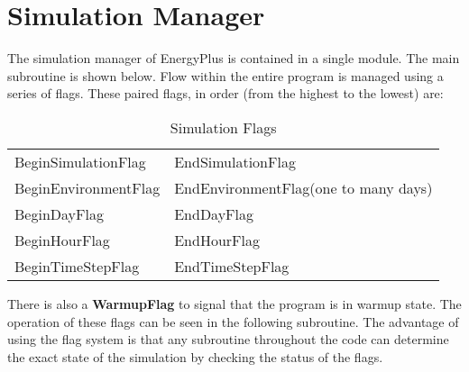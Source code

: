 \section{Simulation Manager}\label{simulation-manager}

The simulation manager of EnergyPlus is contained in a single module. The main subroutine is shown below. Flow within the entire program is managed using a series of flags. These paired flags, in order (from the highest to the lowest) are:

\begin{longtable}[c]{@{}ll@{}}
\caption{Simulation Flags \label{table:simulation-flags}}\\
\toprule 
BeginSimulationFlag & EndSimulationFlag \tabularnewline
BeginEnvironmentFlag & EndEnvironmentFlag(one to many days) \tabularnewline
BeginDayFlag & EndDayFlag \tabularnewline
BeginHourFlag & EndHourFlag \tabularnewline
BeginTimeStepFlag & EndTimeStepFlag \tabularnewline
\bottomrule
\end{longtable}

There is also a \textbf{WarmupFlag} to signal that the program is in warmup state. The operation of these flags can be seen in the following subroutine. The advantage of using the flag system is that any subroutine throughout the code can determine the exact state of the simulation by checking the status of the flags.

